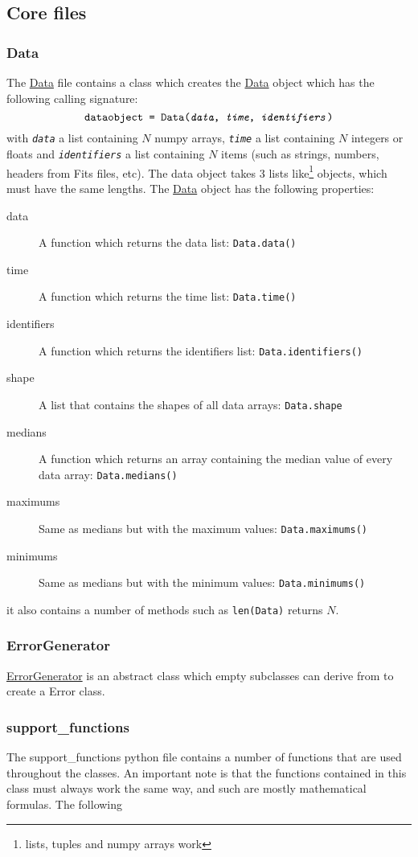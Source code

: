 \documentclass[11pt]{article}
\begin{document}
\subsection{Core files}
\subsubsection{Data}
The \ul{Data} file contains a class which creates the \ul{Data} object which has the following calling signature:
\[\texttt{dataobject = Data(\textit{data}, \textit{time}, \textit{identifiers})}\]
with \texttt{\textit{data}} a list containing $N$ numpy arrays, \texttt{\textit{time}} a list containing $N$ integers or floats and \texttt{\textit{identifiers}} a list containing $N$ items (such as strings, numbers, headers from Fits files, etc). The data object takes 3 lists like\footnote{lists, tuples and numpy arrays work} objects, which must have the same lengths. The \ul{Data} object has the following properties:
\begin{description}
\item [data] A function which returns the data list: \texttt{Data.data()}
\item [time] A function which returns the time list: \texttt{Data.time()}
\item [identifiers] A function which returns the identifiers list: \texttt{Data.identifiers()}
\item [shape] A list that contains the shapes of all data arrays: \texttt{Data.shape}
\item [medians] A function which returns an array containing the median value of every data array: \texttt{Data.medians()}
\item [maximums] Same as medians but with the maximum values: \texttt{Data.maximums()}
\item [minimums] Same as medians but with the minimum values: \texttt{Data.minimums()}
\end{description}
it also contains a number of  methods such as \texttt{len(Data)} returns $N$.

\subsubsection{ErrorGenerator}
\ul{ErrorGenerator} is an abstract class which empty subclasses can derive from to create a Error class. 

\subsubsection{support\_functions}
The support\_functions python file contains a number of functions that are used throughout the classes. An important note is that the functions contained in this class must always work the same way, and such are mostly mathematical formulas. The following 
\end{document}
